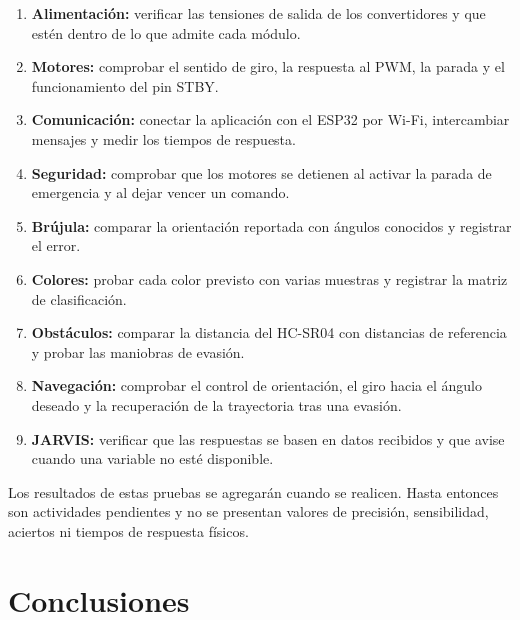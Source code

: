 \documentclass[journal]{IEEEtran}
\begin{document}
\begin{enumerate}[1.]
    \item \textbf{Alimentación:} verificar las tensiones de salida de los convertidores y que estén dentro de lo que admite cada módulo.

    \item \textbf{Motores:} comprobar el sentido de giro, la respuesta al PWM, la parada y el funcionamiento del pin STBY.

    \item \textbf{Comunicación:} conectar la aplicación con el ESP32 por Wi-Fi, intercambiar mensajes y medir los tiempos de respuesta.

    \item \textbf{Seguridad:} comprobar que los motores se detienen al activar la parada de emergencia y al dejar vencer un comando.

    \item \textbf{Brújula:} comparar la orientación reportada con ángulos conocidos y registrar el error.

    \item \textbf{Colores:} probar cada color previsto con varias muestras y registrar la matriz de clasificación.

    \item \textbf{Obstáculos:} comparar la distancia del HC-SR04 con distancias de referencia y probar las maniobras de evasión.

    \item \textbf{Navegación:} comprobar el control de orientación, el giro hacia el ángulo deseado y la recuperación de la trayectoria tras una evasión.

    \item \textbf{JARVIS:} verificar que las respuestas se basen en datos recibidos y que avise cuando una variable no esté disponible.
\end{enumerate}

Los resultados de estas pruebas se agregarán cuando se realicen. Hasta entonces son actividades pendientes y no se presentan valores de precisión, sensibilidad, aciertos ni tiempos de respuesta físicos.


\section{Conclusiones}
\end{document}
